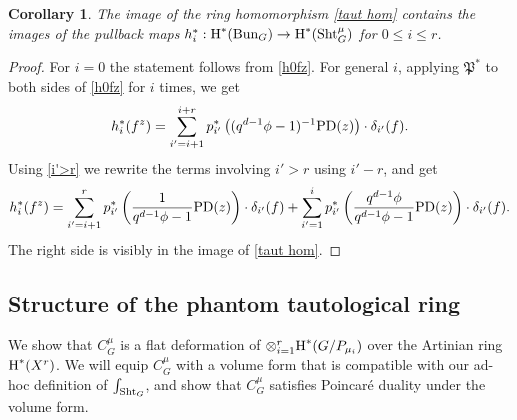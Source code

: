 \documentclass[reqno]{amsart}
\numberwithin{equation}{subsection}
\newtheorem{cor}[subsubsection]{Corollary}
\theoremstyle{definition}
\newcommand\frP{\mathfrak{P}}
\newcommand{\Bun}{\textup{Bun}}
\newcommand\Sht{\textup{Sht}}
\newcommand{\cohog}[2]{\textup{H}^{#1}({#2})}     %
\renewcommand\d\delta
\newcommand\PD{\textup{PD}}
\begin{document}
\begin{cor}\label{c:pullback BunG in taut}
    The image of the ring homomorphism \eqref{taut hom} contains the images of the pullback maps $h_i^*: \cohog{*}{\Bun_G}\to \cohog{*}{\Sht^\mu_G}$ for $0\le i\le r$.
\end{cor}
\begin{proof}
    For $i=0$ the statement follows from \eqref{h0fz}. For general $i$, applying $\frP^*$ to both sides of \eqref{h0fz} for $i$ times, we get
    \begin{equation*}
        h_{i}^*(f^z)=\sum_{i'=i+1}^{i+r}p_{i'}^*\left((q^{d-1}\phi-1)^{-1}\PD(z)\right)\cdot \d_{i'}(f).
    \end{equation*}
    Using \eqref{i'>r} we rewrite the terms involving $i'>r$ using $i'-r$, and get
    \begin{equation*}
        h_{i}^*(f^z)=\sum_{i'=i+1}^{r}p_{i'}^*\left(\frac{1}{q^{d-1}\phi-1}\PD(z)\right)\cdot \d_{i'}(f)+\sum_{i'=1}^{i}p_{i'}^*\left(\frac{q^{d-1}\phi}{q^{d-1}\phi-1}\PD(z)\right)\cdot \d_{i'}(f).
    \end{equation*}
The right side is visibly in the image of \eqref{taut hom}.
\end{proof}







\subsection{Structure of the phantom tautological ring}

We show that $C^\mu_G$ is a flat deformation of $\otimes_{i=1}^r \cohog{*}{G/P_{\mu_i}}$ over the Artinian ring $\cohog{*}{X^r}$. We will equip $C^\mu_G$ with a volume form that is compatible with our ad-hoc definition of $\int_{\Sht_G}$, and show that $C^\mu_G$ satisfies Poincar\'e duality under the volume form. 
\end{document}
